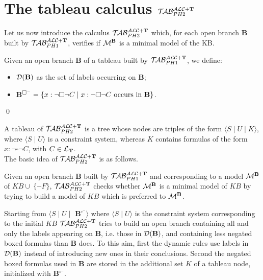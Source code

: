 \documentclass[a4paper, 11pt, oneside]{duthesis}
\newcommand{\tip}{{\bf T}}
\newcommand{\hide}[1]{}
\newcommand{\unione} {\cup}
\newcommand{\nott} {\lnot}
\newcommand{\tc} {\mid}
\newcommand{\bbox}{\square}
\newcommand{\sx} {\langle}
\newcommand{\dx} {\rangle}
\newcommand{\db}{\mathcal{D}(\mbox{\bf B})}
\newcommand{\ellet} {\mathcal{L}_{\bf T}}
\newcommand{\emme} {\begin{mathcal}M\end{mathcal}}
\newcommand{\primo}{\mathrel{{\mathcal{T}\!\mathcal{AB}}}_{PH 1}^{\mathcal{ALC}+\mbox{\scriptsize $\tip$}}}
\newcommand{\secondo}{\mathrel{{\mathcal{T}\!\mathcal{AB}}}_{PH 2}^{\mathcal{ALC}+\mbox{\scriptsize $\tip$}}}
\newenvironment{definition}
{\begin{defi} \rm}{\qed \end{defi}}
\newenvironment{definition}
{\begin{defi} \rm}{\qed \end{defi}}
\newtheorem{definition}{Definition}
\newcounter{posu}
\newtheorem{definition}[posu]{Definition}
\begin{document}
\newpage

\section{The tableau calculus $\secondo$}\label{tableau_ph2}

Let us now introduce the calculus $\secondo$ which, for each open branch {\bf B} built by $\primo$,  verifies if $\emme^{\bf B}$ is a minimal model of the KB.  \hide{We define: need some definitions:}

\begin{definition}\label{db e prefb}

  Given an open branch {\bf B} of a tableau built by $\primo$, we define:
  \begin{itemize}
  \item $\db$ as the set of labels occurring on {\bf B};
    \item {\bf B}$^{\bbox^{-}}=\{x: \nott \bbox \nott C \tc x: \nott \bbox \nott C \ \mbox{occurs in {\bf B}}\}$.
  \end{itemize}
\end{definition}


\hide{\noindent Intuitively, $\db$ is the set of individual constants and variables occurring in {\bf B}, whereas {\bf B}$^{\bbox^{-}}$ is the set of formulas $x: \nott \bbox \nott C$ occurring in {\bf B}.}

\noindent  A tableau of $\secondo$ is a tree whose nodes are triples of the form $\sx S \tc U \tc K \dx$, where $\sx S \tc U \dx$ is a constraint system, whereas $K$ contains formulas of the form $x: \nott \bbox \nott C$, with $C \in \ellet$.\\

The basic idea of $\secondo$ is as follows.

Given an open branch {\bf B} built by $\primo$ and corresponding to a model $\emme^{\bf B}$ of $KB \unione \ \{\nott F\}$, $\secondo$ checks whether $\emme^{\bf B}$ is a minimal model of $KB$ by trying to build a model of $KB$ which is preferred to $\emme^{\bf B}$.

Starting from $\sx S \tc U \tc$ {\bf B}$^{\bbox^-} \dx$ where $\sx S \tc U \dx$ is the  constraint system corresponding to the initial $KB$ $\secondo$ tries to build an open branch containing  all and only the labels appearing on {\bf B}, i.e. those in $\db$, and containing less negated boxed formulas than {\bf B} does. 
To this aim, first the dynamic rules use labels in $\db$ instead of introducing new ones in their conclusions.
Second the negated boxed formulas used in {\bf B} are stored in  the additional set $K$ of a tableau node, initialized with {\bf B}$^{\bbox^-}$.
\end{document}
